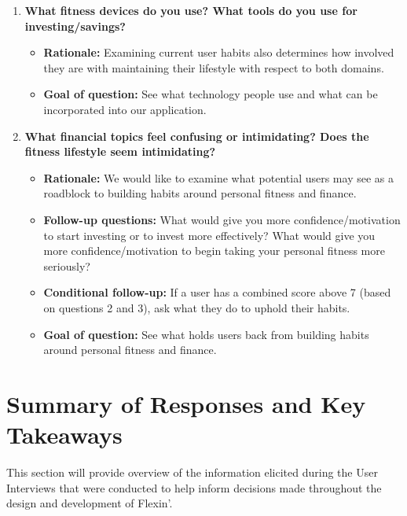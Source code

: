 \documentclass[12pt]{article}
\begin{document}
\begin{enumerate}
\item \textbf{What fitness devices do you use? What tools do you use for investing/savings?}
  \begin{itemize}
    \item \textbf{Rationale:} Examining current user habits also determines how involved they are with maintaining their lifestyle with respect to both domains.
    \item \textbf{Goal of question:} See what technology people use and what can be incorporated into our application.
  \end{itemize}

\item \textbf{What financial topics feel confusing or intimidating? Does the fitness lifestyle seem intimidating?}
  \begin{itemize}
    \item \textbf{Rationale:} We would like to examine what potential users may see as a roadblock to building habits around personal fitness and finance.
    \item \textbf{Follow-up questions:} What would give you more confidence/motivation to start investing or to invest more effectively? What would give you more confidence/motivation to begin taking your personal fitness more seriously?
    \item \textbf{Conditional follow-up:} If a user has a combined score above 7 (based on questions 2 and 3), ask what they do to uphold their habits.
    \item \textbf{Goal of question:} See what holds users back from building habits around personal fitness and finance.
  \end{itemize}
\end{enumerate}

\section{Summary of Responses and Key Takeaways}
This section will provide overview of the information elicited during the User Interviews that were conducted to help inform decisions made throughout the design and development of Flexin'.
\end{document}
